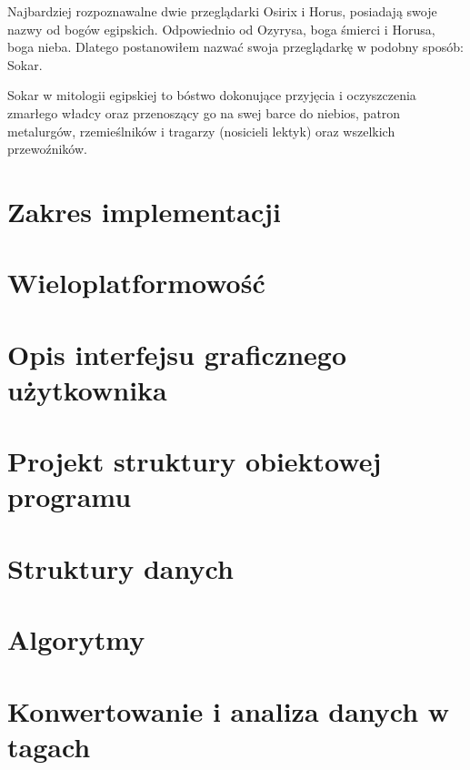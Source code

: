
\par
Najbardziej rozpoznawalne dwie przeglądarki Osirix i Horus, posiadają swoje nazwy od bogów egipskich.
Odpowiednio od Ozyrysa, boga śmierci i Horusa, boga nieba.
Dlatego postanowiłem nazwać swoja przeglądarkę w podobny sposób: Sokar.
\par
Sokar w mitologii egipskiej to bóstwo dokonujące przyjęcia i oczyszczenia zmarłego władcy oraz przenoszący go na swej barce do niebios, patron metalurgów, rzemieślników i tragarzy (nosicieli lektyk) oraz wszelkich przewoźników.

\section{Zakres implementacji}


\section{Wieloplatformowość}


\section{Opis interfejsu graficznego użytkownika}


\section{Projekt struktury obiektowej programu}
\sokarclassExplanations


\section{Struktury danych}


\section{Algorytmy}


\section{Konwertowanie i analiza danych w tagach}


\section{}


\section{}


\section{}


\section{}

